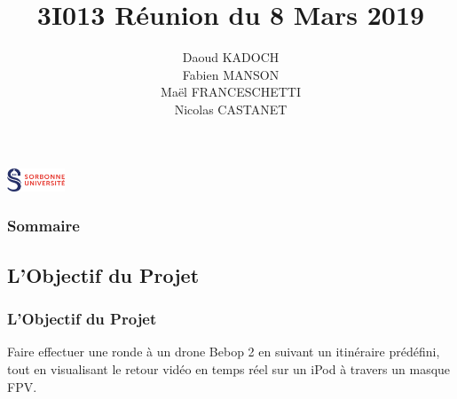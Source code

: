 \documentclass{beamer}
\title{3I013 Réunion du 8 Mars 2019}
\author{Daoud KADOCH\\Fabien MANSON\\Maël FRANCESCHETTI\\Nicolas CASTANET\\}
\begin{document}
	\begin{frame}
		\begin{center}
		\maketitle
		\includegraphics[height=0.7cm]{logo_sorbonne.png}
		\end{center}
	\end{frame}
	\begin{frame}
		\begin{center}
		\frametitle{Sommaire}
		\tableofcontents{}
		\end{center}
	\end{frame}
	\begin{frame}
	\section{L'Objectif du Projet}
		\begin{center}
		\frametitle{L'Objectif du Projet}
		   Faire effectuer une ronde à un drone Bebop 2 en suivant un itinéraire prédéfini, tout en visualisant le retour vidéo en temps réel sur un iPod à travers un masque FPV.
		\end{center}
	\end{frame}
\end{document}
